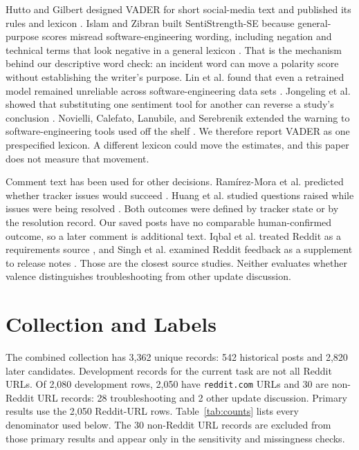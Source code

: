 \documentclass[conference,letterpaper]{IEEEtran}
\begin{document}
Hutto and Gilbert designed VADER for short social-media text and published its rules and lexicon \cite{Hutto2014VADER}. Islam and Zibran built SentiStrength-SE because general-purpose scores misread software-engineering wording, including negation and technical terms that look negative in a general lexicon \cite{Islam2018SentiStrengthSE}. That is the mechanism behind our descriptive word check: an incident word can move a polarity score without establishing the writer's purpose. Lin et al. found that even a retrained model remained unreliable across software-engineering data sets \cite{Lin2018HowFar}. Jongeling et al. showed that substituting one sentiment tool for another can reverse a study's conclusion \cite{Jongeling2017Negative}. Novielli, Calefato, Lanubile, and Serebrenik extended the warning to software-engineering tools used off the shelf \cite{Novielli2021Replication}. We therefore report VADER as one prespecified lexicon. A different lexicon could move the estimates, and this paper does not measure that movement.

Comment text has been used for other decisions. Ram{\'i}rez-Mora et al. predicted whether tracker issues would succeed \cite{RamirezMora2020Issues}. Huang et al. studied questions raised while issues were being resolved \cite{Huang2019Questions}. Both outcomes were defined by tracker state or by the resolution record. Our saved posts have no comparable human-confirmed outcome, so a later comment is additional text. Iqbal et al. treated Reddit as a requirements source \cite{Iqbal2021Reddit}, and Singh et al. examined Reddit feedback as a supplement to release notes \cite{Singh2024ReleaseNotes}. Those are the closest source studies. Neither evaluates whether valence distinguishes troubleshooting from other update discussion.

\section{Collection and Labels}
The combined collection has 3,362 unique records: 542 historical posts and 2,820 later candidates. Development records for the current task are not all Reddit URLs. Of 2,080 development rows, 2,050 have \texttt{reddit.com} URLs and 30 are non-Reddit URL records: 28 troubleshooting and 2 other update discussion. Primary results use the 2,050 Reddit-URL rows. Table~\ref{tab:counts} lists every denominator used below. The 30 non-Reddit URL records are excluded from those primary results and appear only in the sensitivity and missingness checks.
\end{document}
